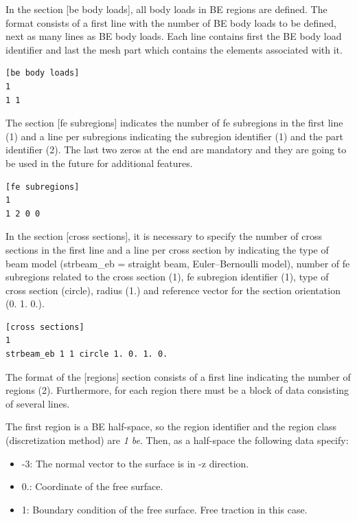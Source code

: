 \documentclass[a4]{article}
\begin{document}
In the section [be body loads], all body loads in BE regions are defined. The format consists of a first line with the number of BE body loads to be defined, next as many lines as BE body loads. Each line contains first the BE body load identifier and last the mesh part which contains the elements associated with it.

\begin{Verbatim}
[be body loads]
1
1 1
\end{Verbatim}

The section [fe subregions] indicates the number of fe subregions in the first line (1) and a line per subregions indicating the subregion identifier (1) and the part identifier (2). The last two zeros at the end are mandatory and they are going to be used in the future for additional features.

\begin{Verbatim}
[fe subregions]
1
1 2 0 0
\end{Verbatim}

In the section [cross sections], it is necessary to specify the number of cross sections in the first line and a line per cross section by indicating the type of beam model (strbeam\_eb = straight beam, Euler–Bernoulli model), number of fe subregions related to the cross section (1), fe subregion identifier (1), type of cross section (circle), radius (1.) and reference vector for the section orientation (0. 1. 0.).

\begin{Verbatim}
[cross sections]
1
strbeam_eb 1 1 circle 1. 0. 1. 0.
\end{Verbatim}

The format of the [regions] section consists of a first line indicating the number of regions (2). Furthermore, for each region there must be a block of data consisting of several lines. 

The first region is a BE half-space, so the region identifier and the region class (discretization method) are \emph{1 be}. Then, as a half-space the following data specify:

\begin{itemize}
	\item -3: The normal vector to the surface is in -z direction.
	\item 0.: Coordinate of the free surface.
	\item 1: Boundary condition of the free surface. Free traction in this case. 
\end{itemize}
\end{document}
